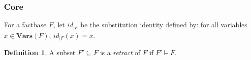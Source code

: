 \documentclass{article}
\theoremstyle{definition}
\newtheorem{definition}{Definition}[section]
\theoremstyle{remark}
\newcommand{\Vars}{\textbf{Vars}}
\newcommand{\Terms}{\textbf{Terms}}
\begin{document}




\subsubsection{Core}

For a factbase $F$, let $id_{|F}$ be the substitution identity defined by: for all variables $x \in \Vars(F)$, $id_{|F}(x) = x$.


\begin{definition}
A subset $F' \subseteq F$ is a \emph{retract} of $F$ if $F' \models F$.
\end{definition}
\end{document}
